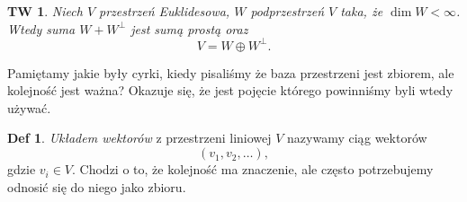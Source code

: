 \documentclass[a4paper, 12pt]{mwart}
\theoremstyle{definition}
\newtheorem{definicja}{Def}[section]
\theoremstyle{plain}
\newtheorem{twierdzenie}{TW}[section]
\theoremstyle{remark}
\begin{document}
\begin{twierdzenie}
	Niech $V$ \ppauza przestrzeń Euklidesowa, $W$ \ppauza podprzestrzeń $V$ taka, że $\dim W < \infty$. Wtedy suma $W + W^\perp$ jest sumą prostą oraz
	\begin{equation}
		V = W \oplus W^\perp.
	\end{equation}
\end{twierdzenie}
Pamiętamy jakie były cyrki, kiedy pisaliśmy że baza przestrzeni jest zbiorem, ale kolejność jest ważna? Okazuje się, że jest pojęcie którego powinniśmy byli wtedy używać.
\begin{definicja}
	\emph{Układem wektorów} z przestrzeni liniowej $V$ nazywamy ciąg wektorów
	\begin{equation}
		\left(v_1, v_2, \ldots\right),
	\end{equation}
	gdzie $v_i \in V$. Chodzi o to, że kolejność ma znaczenie, ale często potrzebujemy odnosić się do niego jako zbioru.
\end{definicja}
\end{document}
